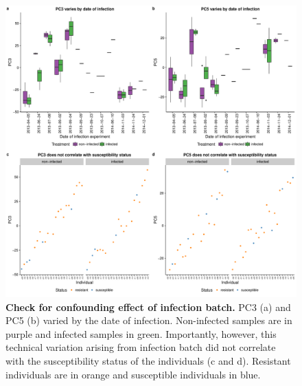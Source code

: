 \begin{figure}[!htb]
\centering \includegraphics[width=5in]{img/ch03/batch-infection.pdf}
\caption[Check for confounding effect of infection batch.]{
  \textbf{Check for confounding effect of infection batch.} PC3 (a)
  and PC5 (b) varied by the date of infection. Non-infected samples
  are in purple and infected samples in green. Importantly, however,
  this technical variation arising from infection batch did not
  correlate with the susceptibility status of the individuals (c and
  d). Resistant individuals are in orange and susceptible individuals
  in blue.  }
\label{fig:infection}
\end{figure}

